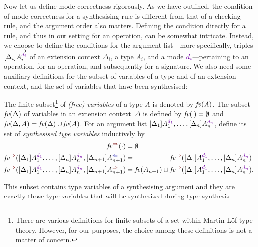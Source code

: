 Now let us define mode-correctness rigorously.
As we have outlined, the condition of mode-correctness for a synthesising rule is different from that of a checking rule, and the argument order also matters.
Defining the condition directly for a rule, and thus in our setting for an operation, can be somewhat intricate.
Instead, we choose to define the conditions for the argument list---more specifically, triples $\biargvec$ of an extension context $\Delta_i$, a type $A_i$, and a mode $\dir{d_i}$---pertaining to an operation, for an operation, and subsequently for a signature.
We also need some auxiliary definitions for the subset of variables of a type and of an extension context, and the set of variables that have been synthesised:
\begin{definition}
  The finite subset\footnote{%
  There are various definitions for finite subsets of a set within Martin-L\"{o}f type theory.
  However, for our purposes, the choice among these definitions is not a matter of concern.}
  of \emph{(free) variables} of a type $A$ is denoted by $\mathit{fv}(A)$.
  The subset $\mathit{fv}(\Delta)$ of variables in an extension context~$\Delta$ is defined by\/ $\mathit{fv}(\cdot) = \emptyset$ and\/ $\mathit{fv}(\Delta, A) = \mathit{fv}(\Delta) \cup \mathit{fv}(A)$.
  For an argument list $\biargs$, define its set of \emph{synthesised type variables} inductively by 
  \begin{align}
    \label{eq:synvar1}\synvar(\cdot)                   & = \emptyset  \\
    \label{eq:synvar2}\synvar(\biargs, \chkbiarg[n+1]) & = \phantom{\fv(A_{n+1}) \cup {}} \synvar(\biargs) \\
    \label{eq:synvar3}\synvar(\biargs, \synbiarg[n+1]) & = \fv(A_{n+1}) \cup           \synvar(\biargs).
  \end{align}
\end{definition}
This subset contains type variables of a synthesising argument and they are exactly those type variables that will be synthesised during type synthesis.

